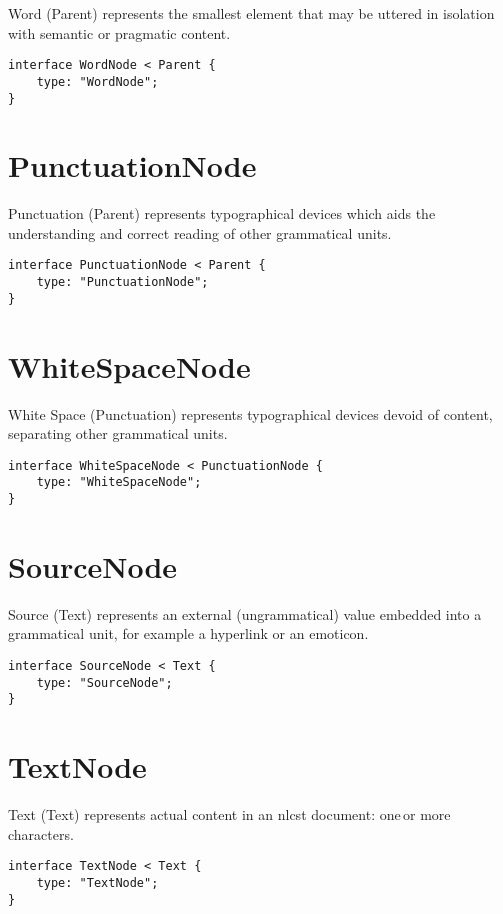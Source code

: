 Word (Parent) represents the smallest element that may be uttered in
isolation with semantic or pragmatic content.

\begin{lstlisting}
interface WordNode < Parent {
    type: "WordNode";
}
\end{lstlisting}

\section*{PunctuationNode}\label{punctuationnode}

Punctuation (Parent) represents typographical devices which aids the
understanding and correct reading of other grammatical units.

\begin{lstlisting}
interface PunctuationNode < Parent {
    type: "PunctuationNode";
}
\end{lstlisting}

\section*{WhiteSpaceNode}\label{whitespacenode}

White Space (Punctuation) represents typographical devices devoid of
content, separating other grammatical units.

\begin{lstlisting}
interface WhiteSpaceNode < PunctuationNode {
    type: "WhiteSpaceNode";
}
\end{lstlisting}

\section*{SourceNode}\label{sourcenode}

Source (Text) represents an external (ungrammatical) value embedded
into a grammatical unit, for example a hyperlink or an emoticon.

\begin{lstlisting}
interface SourceNode < Text {
    type: "SourceNode";
}
\end{lstlisting}

\section*{TextNode}\label{textnode}

Text (Text) represents actual content in an \gls{nlcst} document: one\,or more
characters.

\begin{lstlisting}
interface TextNode < Text {
    type: "TextNode";
}
\end{lstlisting}
